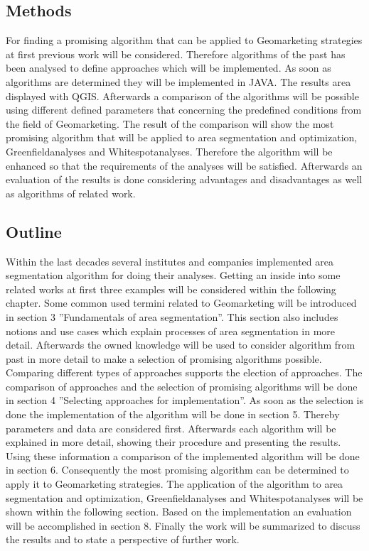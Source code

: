 \subsection{Methods}
For finding a promising algorithm that can be applied to Geomarketing strategies at first previous work will be considered. Therefore algorithms of the past has been analysed to define approaches which will be implemented. As soon as algorithms are determined they will be implemented in JAVA. The results area displayed with QGIS. Afterwards a comparison of the algorithms will be possible using different defined parameters that concerning the predefined conditions from the field of Geomarketing. The result of the comparison will show the most promising algorithm that will be applied to area segmentation and optimization, Greenfieldanalyses and Whitespotanalyses. Therefore the algorithm will be enhanced so that the requirements of the analyses will be satisfied. Afterwards an evaluation of the results is done considering advantages and disadvantages as well as algorithms of related work. 

\subsection{Outline}
Within the last decades several institutes and companies implemented area segmentation algorithm for doing their analyses. Getting an inside into some related works at first three examples will be considered within the following chapter. Some common used termini related to Geomarketing will be introduced in section 3 ''Fundamentals of area segmentation''. This section also includes notions and use cases which explain processes of area segmentation in more detail. Afterwards the owned knowledge will be used to consider algorithm from past in more detail to make a selection of promising algorithms possible. Comparing different types of approaches supports the election of approaches. The comparison of approaches and the selection of promising algorithms will be done in section 4 ''Selecting approaches for implementation''. As soon as the selection is done the implementation of the algorithm will be done in section 5. Thereby parameters and data are considered first. Afterwards each algorithm will be explained in more detail, showing their procedure and presenting the results. Using these information a comparison of the implemented algorithm will be done in section 6. Consequently the most promising algorithm can be determined to apply it to Geomarketing strategies. The application of the algorithm to area segmentation and optimization, Greenfieldanalyses and Whitespotanalyses will be shown within the following section. Based on the implementation an evaluation will be accomplished in section 8. Finally the work will be summarized to discuss the results and to state a perspective of further work.
